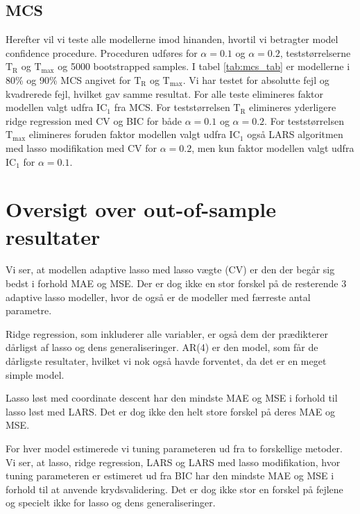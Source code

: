 \subsection{MCS} 
Herefter vil vi teste alle modellerne imod hinanden, hvortil vi betragter model confidence procedure.
Proceduren udføres for \(\alpha = 0.1\) og \(\alpha = 0.2\), teststørrelserne \(\text{T}_\text{R}\) og \(\text{T}_\text{max}\) og 5000 bootstrapped samples.
I tabel \ref{tab:mcs_tab} er modellerne i 80\% og 90\% MCS angivet for \(\text{T}_\text{R}\) og \(\text{T}_\text{max}\).
Vi har testet for absolutte fejl og kvadrerede fejl, hvilket gav samme resultat.
For alle teste elimineres faktor modellen valgt udfra IC\(_1\) fra MCS.
For teststørrelsen \(\text{T}_\text{R}\) elimineres yderligere ridge regression med CV og BIC for både \(\alpha = 0.1\) og \(\alpha = 0.2\).
For teststørrelsen \(\text{T}_\text{max}\) elimineres foruden faktor modellen valgt udfra IC\(_1\) også LARS algoritmen med lasso modifikation med CV for \(\alpha = 0.2\), men kun faktor modellen valgt udfra IC\(_1\) for \(\alpha = 0.1\).
%

%

\section{Oversigt over out-of-sample resultater}
Vi ser, at modellen adaptive lasso med lasso vægte (CV) er den der begår sig bedst i forhold MAE og MSE. 
Der er dog ikke en stor forskel på de resterende 3 adaptive lasso modeller, hvor de også er de modeller med færreste antal parametre. 

Ridge regression, som inkluderer alle variabler, er også dem der prædikterer dårligst af lasso og dens generaliseringer. 
AR(4) er den model, som får de dårligste resultater, hvilket vi nok også havde forventet, da det er en meget simple model. 

Lasso løst med coordinate descent har den mindste MAE og MSE i forhold til lasso løst med LARS. Det er dog ikke den helt store forskel på deres MAE og MSE. 

For hver model estimerede vi tuning parameteren ud fra to forskellige metoder. Vi ser, at lasso, ridge regression, LARS og LARS med lasso modifikation, hvor tuning parameteren er estimeret ud fra BIC har den mindste MAE og MSE i forhold til at anvende krydsvalidering. Det er dog ikke stor en forskel på fejlene og specielt ikke for lasso og dens generaliseringer. 

%
%


